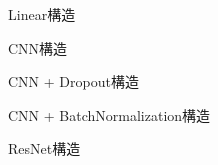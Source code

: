 \begin{figure}[htb]
    \centering
    
    \caption{Linear構造}
    \label{fig:result1:2:linear}
\end{figure}

\begin{figure}[htb]
    \centering
    
    \caption{CNN構造}
    \label{fig:result1:2:cnn}
\end{figure}

\begin{figure}[htb]
    \centering
    
    \caption{CNN + Dropout構造}
    \label{fig:result1:2:cnn:dropout}
\end{figure}

\begin{figure}[htb]
    \centering
    
    \caption{CNN + BatchNormalization構造}
    \label{fig:result1:2:cnn:batchnormalization}
\end{figure}

\begin{figure}[htb]
    \centering
    
    \caption{ResNet構造}
    \label{fig:result1:2:resnet}
\end{figure}

\clearpage
